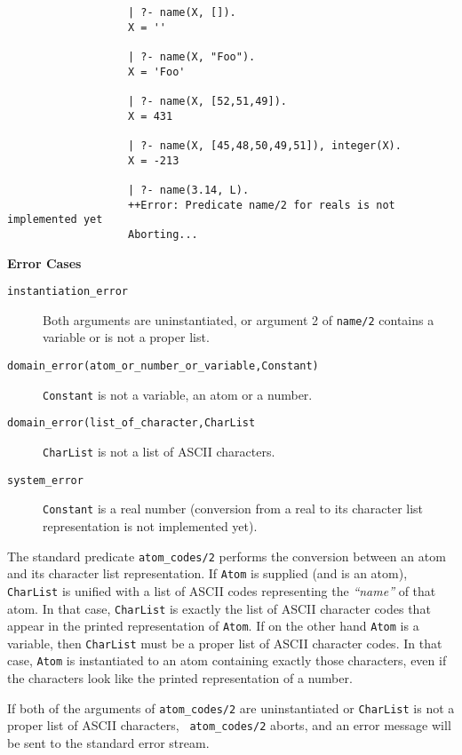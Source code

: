 \begin{description}
{\begin{verbatim}
                   | ?- name(X, []).
                   X = ''

                   | ?- name(X, "Foo").
                   X = 'Foo'

                   | ?- name(X, [52,51,49]).
                   X = 431

                   | ?- name(X, [45,48,50,49,51]), integer(X).
                   X = -213

                   | ?- name(3.14, L).
                   ++Error: Predicate name/2 for reals is not implemented yet
                   Aborting...
     \end{verbatim}}

{\bf Error Cases}
     \begin{description}
     \item[{\tt instantiation\_error}]
	Both arguments are uninstantiated, or argument 2 of {\tt name/2} 
	contains a variable or is not a proper list.
     \item[{\tt domain\_error(atom\_or\_number\_or\_variable,Constant)}]
	{\tt Constant} is not a variable, an atom or a number.
     \item[{\tt domain\_error(list\_of\_character,CharList}]
	{\tt CharList} is not a list of ASCII characters.
     \item[{\tt system\_error}]
	{\tt Constant} is a real number (conversion from a real to its 
	character list representation is not implemented yet).
     \end{description}

    The standard predicate {\tt atom\_codes/2} performs the conversion 
    between an atom and its character list representation. 
    If {\tt Atom} is supplied (and is an atom), {\tt CharList} 
    is unified with a list of ASCII codes representing the {\em ``name''} 
    of that atom.  In that case, {\tt CharList} is exactly the list of 
    ASCII character codes that appear in the printed representation of 
    {\tt Atom}.  If on the other hand {\tt Atom} is a variable, 
    then {\tt CharList} must be a proper list of ASCII character codes. 
    In that case, {\tt Atom} is instantiated to an atom containing
    exactly those characters, even if the characters look like the
    printed representation of a number.

    If both of the arguments of {\tt atom\_codes/2} are uninstantiated or
    {\tt CharList} is not a proper list of ASCII characters, {\tt
    atom\_codes/2} aborts, and an error message will be sent to
    the standard error stream.


\end{description}
